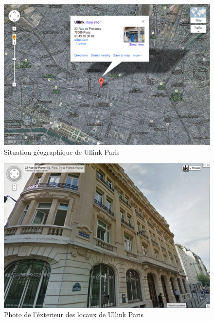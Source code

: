 \documentclass[a4paper, 12pt]{article}
\begin{document}
\begin{figure}
\includegraphics[width=\textwidth]{ullink_loc.png}
\caption{Situation géographique de Ullink Paris}
\label{ullink_loc}
\end{figure}

\begin{figure}
\includegraphics[width=\textwidth]{ullink_photo.png}
\caption{Photo de l'éxterieur des locaux de Ullink Paris}
\label{ullink_photo}
\end{figure}

\pagebreak


\end{document}
